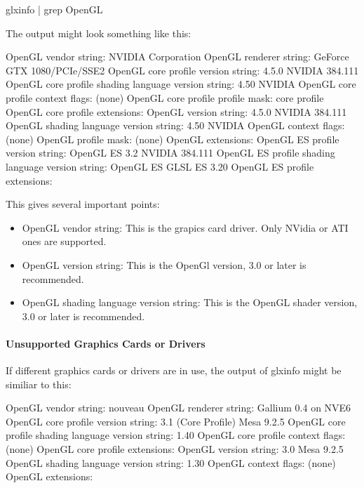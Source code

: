 \begin{cverbatim}
glxinfo | grep OpenGL
\end{cverbatim}

The output might look something like this:

\begin{cverbatim}
OpenGL vendor string: NVIDIA Corporation
OpenGL renderer string: GeForce GTX 1080/PCIe/SSE2
OpenGL core profile version string: 4.5.0 NVIDIA 384.111
OpenGL core profile shading language version string: 4.50 NVIDIA
OpenGL core profile context flags: (none)
OpenGL core profile profile mask: core profile
OpenGL core profile extensions:
OpenGL version string: 4.5.0 NVIDIA 384.111
OpenGL shading language version string: 4.50 NVIDIA
OpenGL context flags: (none)
OpenGL profile mask: (none)
OpenGL extensions:
OpenGL ES profile version string: OpenGL ES 3.2 NVIDIA 384.111
OpenGL ES profile shading language version string: OpenGL ES GLSL ES 3.20
OpenGL ES profile extensions:
\end{cverbatim}

This gives several important points:

\begin{itemize}  
\item OpenGL vendor string: This is the grapics card driver. Only NVidia or ATI ones are supported.
\item OpenGL version string: This is the OpenGl version, 3.0 or later is recommended.
\item OpenGL shading language version string: This is the OpenGL shader version, 3.0 or later is recommended.
\end{itemize}

\paragraph{Unsupported Graphics Cards or Drivers}

If different graphics cards or drivers are in use, the output of glxinfo might be similiar to this:

\begin{cverbatim}
OpenGL vendor string: nouveau
OpenGL renderer string: Gallium 0.4 on NVE6
OpenGL core profile version string: 3.1 (Core Profile) Mesa 9.2.5
OpenGL core profile shading language version string: 1.40
OpenGL core profile context flags: (none)
OpenGL core profile extensions:
OpenGL version string: 3.0 Mesa 9.2.5
OpenGL shading language version string: 1.30
OpenGL context flags: (none)
OpenGL extensions:
\end{cverbatim}

